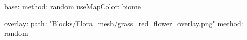 base:
  method: random
  useMapColor: biome
  
overlay:
  path: "Blocks/Flora_mesh/grass_red_flower_overlay.png"
  method: random